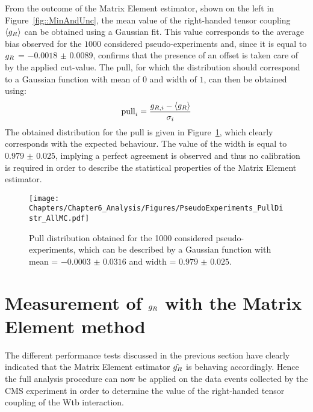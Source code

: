From the outcome of the Matrix Element estimator, shown on the left in Figure~\ref{fig::MinAndUnc}, the mean value of the right-handed tensor coupling $\left\langle g_{R} \right\rangle$ can be obtained using a Gaussian fit.
This value corresponds to the average bias observed for the $1 000$ considered pseudo-experiments and, since it is equal to $g_{R}$ = $-0.0018$ $\pm$ $0.0089$, confirms that the presence of an offset is taken care of by the applied cut-value.
The pull, for which the distribution should correspond to a Gaussian function with mean of $0$ and width of $1$, can then be obtained using:
\begin{equation}
 \textrm{pull}_{i} = \frac{g_{R,i} - \left\langle g_{R} \right\rangle}{\sigma_{i}}
\end{equation}
The obtained distribution for the pull is given in Figure~\ref{fig::PullDistr}, which clearly corresponds with the expected behaviour.
The value of the width is equal to $0.979$ $\pm$ $0.025$, implying a perfect agreement is observed and thus no calibration is required in order to describe the statistical properties of the Matrix Element estimator.
\begin{figure}[h!t]
 \centering
 \texttt{[image: Chapters/Chapter6\_Analysis/Figures/PseudoExperiments\_PullDistr\_AllMC.pdf]}
 \caption{Pull distribution obtained for the 1000 considered pseudo-experiments, which can be described by a Gaussian function with mean = $-0.0003$ $\pm$ $0.0316$ and width = $0.979$ $\pm$ $0.025$.} \label{fig::PullDistr}
\end{figure}

\section{Measurement of $g_{R}$ with the Matrix Element method} \label{sec::gRMeas}

The different performance tests discussed in the previous section have clearly indicated that the Matrix Element estimator $\hat{g_{R}}$ is behaving accordingly.
Hence the full analysis procedure can now be applied on the data events collected by the CMS experiment in order to determine the value of the right-handed tensor coupling of the Wtb interaction.

